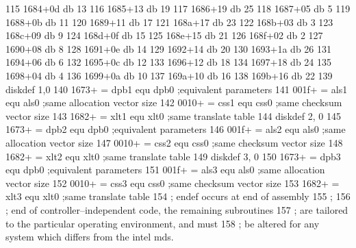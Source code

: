 115      1684+0d                   db       13
116      1685+13                   db       19
117      1686+19                   db       25
118      1687+05                   db       5
119      1688+0b                   db       11
120      1689+11                   db       17
121      168a+17                   db       23
122      168b+03                   db       3
123      168c+09                   db       9
124      168d+0f                   db       15
125      168e+15                   db       21
126      168f+02                   db       2
127      1690+08                   db       8
128      1691+0e                   db       14
129      1692+14                   db       20
130      1693+1a                   db       26
131      1694+06                   db       6
132      1695+0c                   db       12
133      1696+12                   db       18
134      1697+18                   db       24
135      1698+04                   db       4
136      1699+0a                   db       10
137      169a+10                   db       16
138      169b+16                   db       22
139                                diskdef  1,0
140      1673+ =          dpb1     equ      dpb0       ;equivalent parameters
141      001f+ =          als1     equ      als0       ;same allocation vector size
142      0010+ =          css1     equ      css0       ;same checksum vector size
143      1682+ =          xlt1     equ      xlt0       ;same translate table
144                                diskdef  2, 0
145      1673+ =          dpb2     equ      dpb0       ;equivalent parameters
146      001f+ =          als2     equ      als0       ;same allocation vector size
147      0010+ =          css2     equ      css0       ;same checksum vector size
148      1682+ =          xlt2     equ      xlt0       ;same translate table
149                                diskdef  3, 0
150      1673+ =          dpb3     equ      dpb0       ;equivalent parameters
151      001f+ =          als3     equ      als0       ;same allocation vector size
152      0010+ =          css3     equ      css0       ;same checksum vector size
153      1682+ =          xlt3     equ      xlt0       ;same translate table
154                       ;        endef occurs at end of assembly
155                       ;
156                       ;        end of controller--independent code, the remaining subroutines
157                       ;        are tailored to the particular operating environment, and must
158                       ;        be altered for any system which differs from the intel mds.
